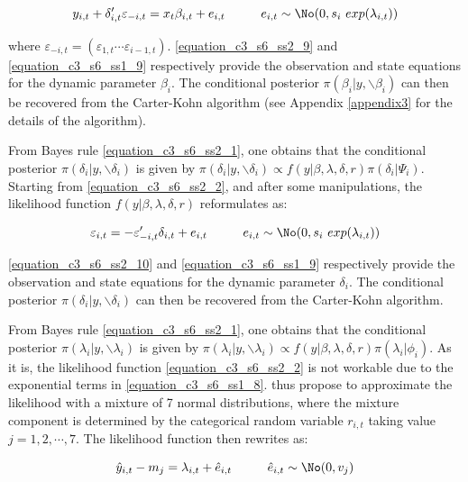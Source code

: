 \begin{equation}
y_{i,t}+\delta_{i,t}' \varepsilon_{-i,t}=x_t \beta_{i,t}+ e_{i,t} \hspace{10mm} e_{i,t} \sim \No(0,s_i \ exp(\lambda_{i,t}))
\label{equation_c3_s6_ss2_9} 
\end{equation}

where $\varepsilon_{-i,t} = (\varepsilon_{1,t} \cdots \varepsilon_{i-1,t})$. \ref{equation_c3_s6_ss2_9} and \ref{equation_c3_s6_ss1_9} respectively provide the observation and state equations for the dynamic parameter $\beta_i$. The conditional posterior $\pi(\beta_i | y, \backslash \beta_i)$ can then be recovered from the Carter-Kohn algorithm (see Appendix \ref{appendix3} for the details of the algorithm).

From Bayes rule \ref{equation_c3_s6_ss2_1}, one obtains that the conditional posterior $\pi(\delta_i | y, \backslash \delta_i)$ is given by $\pi(\delta_i | y, \backslash \delta_i) \propto f(y | \beta, \lambda, \delta, r) \pi(\delta_i | \Psi_i)$. Starting from \ref{equation_c3_s6_ss2_2}, and after some manipulations, the likelihood function $f(y | \beta, \lambda, \delta, r)$ reformulates as:

\begin{equation}
\varepsilon_{i,t}=-\varepsilon_{-i,t}' \delta_{i,t}+ e_{i,t} \hspace{10mm} e_{i,t} \sim \No (0,s_i \ exp(\lambda_{i,t}))
\label{equation_c3_s6_ss2_10}
\end{equation}

\ref{equation_c3_s6_ss2_10} and \ref{equation_c3_s6_ss1_9} respectively provide the observation and state equations for the dynamic parameter $\delta_i$. The conditional posterior $\pi(\delta_i | y, \backslash \delta_i)$ can then be recovered from the Carter-Kohn algorithm.

From Bayes rule \ref{equation_c3_s6_ss2_1}, one obtains that the conditional posterior $\pi(\lambda_i | y, \backslash \lambda_i)$ is given by $\pi(\lambda_i | y, \backslash \lambda_i) \propto f(y | \beta, \lambda, \delta, r) \pi(\lambda_i | \phi_i)$. As it is, the likelihood function \ref{equation_c3_s6_ss2_2} is not workable due to the exponential terms in \ref{equation_c3_s6_ss1_8}. \cite{Kim1998} thus propose to approximate the likelihood with a mixture of 7 normal distributions, where the mixture component is determined by the categorical random variable $r_{i,t}$ taking value $j= 1, 2, \cdots, 7$. The likelihood function then rewrites as:

\begin{equation}
\hat{y}_{i,t} - m_j = \lambda_{i,t} + \hat{e}_{i,t} \hspace{10mm} \hat{e}_{i,t} \sim \No (0,v_j)
\label{equation_c3_s6_ss2_11} 
\end{equation}


